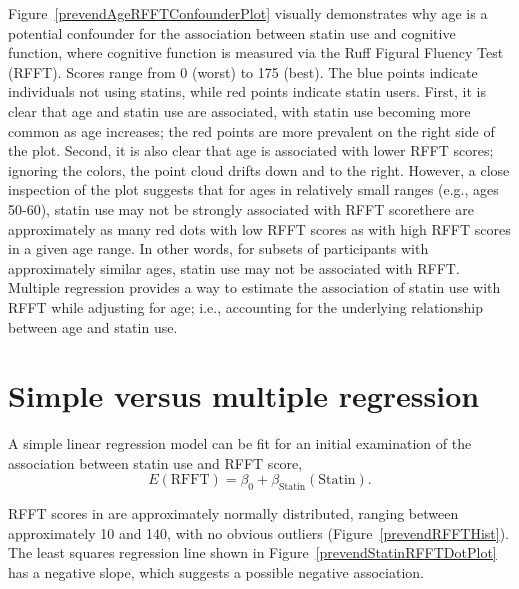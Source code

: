 Figure~\ref{prevendAgeRFFTConfounderPlot} visually demonstrates why age is a potential confounder for the association between statin use and cognitive function, where cognitive function is measured via the Ruff Figural Fluency Test (RFFT). Scores range from 0 (worst) to 175 (best). The blue points indicate individuals not using statins, while red points indicate statin users. First, it is clear that age and statin use are associated, with statin use becoming more common as age increases; the red points are more prevalent on the right side of the plot. Second, it is also clear that age is associated with lower RFFT scores; ignoring the colors, the point cloud drifts down and to the right. However, a close inspection of the plot suggests that for ages in relatively small ranges (e.g., ages 50-60), statin use may not be strongly associated with RFFT score\textemdash there are approximately as many red dots with low RFFT scores as with high RFFT scores in a given age range. In other words, for subsets of participants with approximately similar ages, statin use may not be associated with RFFT. Multiple regression provides a way to estimate the association of statin use with RFFT while adjusting for age; i.e., accounting for the underlying relationship between age and statin use.

\section{Simple versus multiple regression}
\label{simpleVsMultipleRegression}

A simple linear regression model can be fit for an initial examination of the association between statin use and RFFT score,
\[
E(\text{RFFT}) = \beta_0 + \beta_{\text{Statin}}(\text{Statin}).
\label{RFFTStatinModel}
\]

RFFT scores in  are approximately normally distributed, ranging between approximately 10 and 140, with no obvious outliers (Figure~\ref{prevendRFFTHist}). The least squares regression line shown in Figure~\ref{prevendStatinRFFTDotPlot} has a negative slope, which suggests a possible negative association. 

